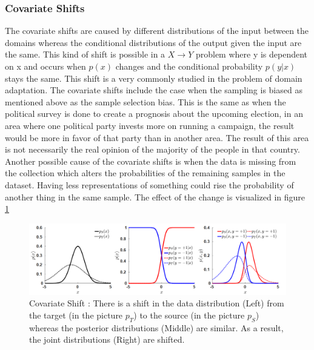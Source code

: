 \subsubsection*{Covariate Shifts}
The covariate shifts are caused by different distributions of the input between the domains whereas the conditional distributions of the output given the input are the same. This kind of shift is possible in a $X \to Y$ problem where y is dependent on x and occurs when $p(x)$ changes and the conditional probability $p(y|x)$ stays the same. This shift is a very commonly studied in the problem of domain adaptation. The covariate shifts include the case when the sampling is biased as mentioned above as the sample selection bias. This is the same as when the political survey is done to create a prognosis about the upcoming election, in an area where one political party invests more on running a campaign, the result would be more in favor of that party than in another area. The result of this area is not necessarily the real opinion of the majority of the people in that country. 
Another possible cause of the covariate shifts is when the data is missing from the collection which alters the probabilities of the remaining samples in the dataset. Having less representations of something could rise the probability of another thing in the same sample. The effect of the change is visualized in figure \ref{fig:covariateShiftPic}
\begin{figure}[tbh]
  \centering
    \includegraphics[width=\linewidth]{abbildungen/covariateShiftPic.png}
  \caption{Covariate Shift \cite{dataShifts}: There is a shift in the data distribution (Left) from the target (in the picture $p_T$) to the source (in the picture $p_S$) whereas the posterior distributions (Middle) are similar. As a result, the joint distributions (Right) are shifted.}
  \label{fig:covariateShiftPic}
\end{figure}

